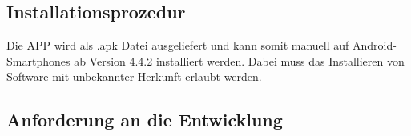 %
%
%
%


\subsection{\textbf{Installationsprozedur}}

Die \acs{APP} wird als .apk Datei ausgeliefert und kann somit manuell auf Android-Smartphones ab Version 4.4.2 installiert werden.
Dabei muss das Installieren von Software mit unbekannter Herkunft erlaubt werden.


%


\subsection{\textbf{Anforderung an die Entwicklung}}

